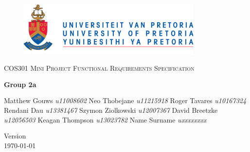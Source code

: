 \begin{titlepage}
	\begin{center}
		
		\begin{figure}[t]
			\centering
			\includegraphics[width=350px]{UP_Logo.png}
		\end{figure}
		
		\textsc{\LARGE COS301 Mini Project Functional \newline\newline Requirements Specification}
		
		\textbf{\newline Group 2a} \\
		\begin{flushright} \large
			Matthew Gouws \emph{u11008602} \newline
			Neo Thobejane \emph{u11215918} \newline
			Roger Tavares \emph{u10167324} \newline
			Rendani Dau \emph{u13381467} \newline
			Szymon Ziolkowski \emph{u12007367} \newline
			David Breetzke  \emph{u12056503} \newline
			Keagan Thompson \emph{u13023782} \newline
			Name Surname \emph{uxxxxxxxx} \newline
		\end{flushright}
		
		\vfill
		
		{\large Version }
		\\
		{\large \today}
		
	\end{center}
\end{titlepage}
